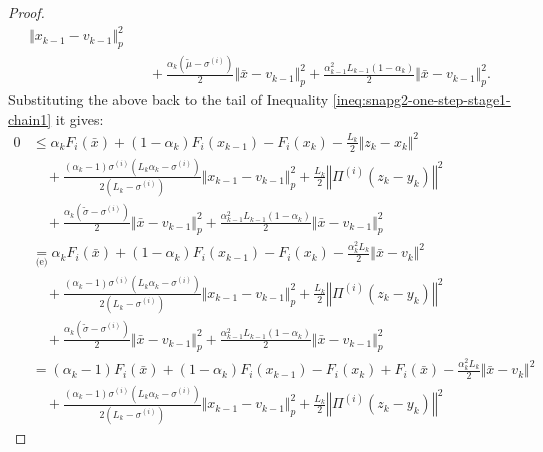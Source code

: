 \documentclass[12pt]{article}
\begin{document}
\begin{proof}
{\begin{align*}
                \Vert x_{k - 1} - v_{k - 1} \Vert^2_p
                \\ &\quad 
                + \frac{\alpha_k(\tilde\mu - \sigma^{(i)})}{2} \Vert \bar x - v_{k - 1}\Vert^2_p
                + \frac{\alpha_{k - 1}^2L_{k - 1}(1 - \alpha_k)}{2} \Vert \bar x - v_{k - 1}\Vert^2_p.
        \end{align*}
        }
        Substituting the above back to the tail of Inequality \eqref{ineq:snapg2-one-step-stage1-chain1} it gives: 
        {\allowdisplaybreaks
        \begin{align*}
            0 &\le 
            \alpha_k F_i(\bar x) + (1 - \alpha_k)F_i(x_{k - 1}) - F_i(x_k)     
            - \frac{L_k}{2}\Vert z_k - x_k\Vert^2 
                \\ &\quad 
                + \frac{(\alpha_k - 1)\sigma^{(i)}\left(L_k\alpha_k - \sigma^{(i)}\right)}{2\left(L_k - \sigma^{(i)}\right)}\Vert x_{k - 1} - v_{k - 1} \Vert^2_p
                + \frac{L_k}{2}\left\Vert \Pi^{(i)}(z_k - y_k)\right\Vert^2
                \\ &\quad 
                + \frac{\alpha_k(\tilde\sigma - \sigma^{(i)})}{2} \Vert \bar x - v_{k - 1}\Vert^2_p
                + \frac{\alpha_{k - 1}^2L_{k - 1}(1 - \alpha_k)}{2} \Vert \bar x - v_{k - 1}\Vert^2_p
            \\
            &\underset{\text{(e)}}{=} 
            \alpha_k F_i(\bar x) + (1 - \alpha_k)F_i(x_{k - 1}) - F_i(x_k)     
            - \frac{\alpha_k^2L_k}{2}\Vert \bar x - v_k\Vert^2 
                \\ &\quad 
                + \frac{(\alpha_k - 1)\sigma^{(i)}\left(L_k\alpha_k - \sigma^{(i)}\right)}{2\left(L_k - \sigma^{(i)}\right)}\Vert x_{k - 1} - v_{k - 1} \Vert^2_p
                + \frac{L_k}{2}\left\Vert \Pi^{(i)}(z_k - y_k)\right\Vert^2
                \\ &\quad 
                + \frac{\alpha_k(\tilde\sigma - \sigma^{(i)})}{2} \Vert \bar x - v_{k - 1}\Vert^2_p
                + \frac{\alpha_{k - 1}^2L_{k - 1}(1 - \alpha_k)}{2} \Vert \bar x - v_{k - 1}\Vert^2_p
            \\
            &= 
            (\alpha_k - 1) F_i(\bar x) + (1 - \alpha_k)F_i(x_{k - 1}) - F_i(x_k) + F_i(\bar x)
            - \frac{\alpha_k^2L_k}{2}\Vert \bar x - v_k\Vert^2 
                \\ &\quad 
                + \frac{(\alpha_k - 1)\sigma^{(i)}\left(L_k\alpha_k - \sigma^{(i)}\right)}{2\left(L_k - \sigma^{(i)}\right)}\Vert x_{k - 1} - v_{k - 1} \Vert^2_p
                + \frac{L_k}{2}\left\Vert \Pi^{(i)}(z_k - y_k)\right\Vert^2

\end{align*}}
\end{proof}
\end{document}
